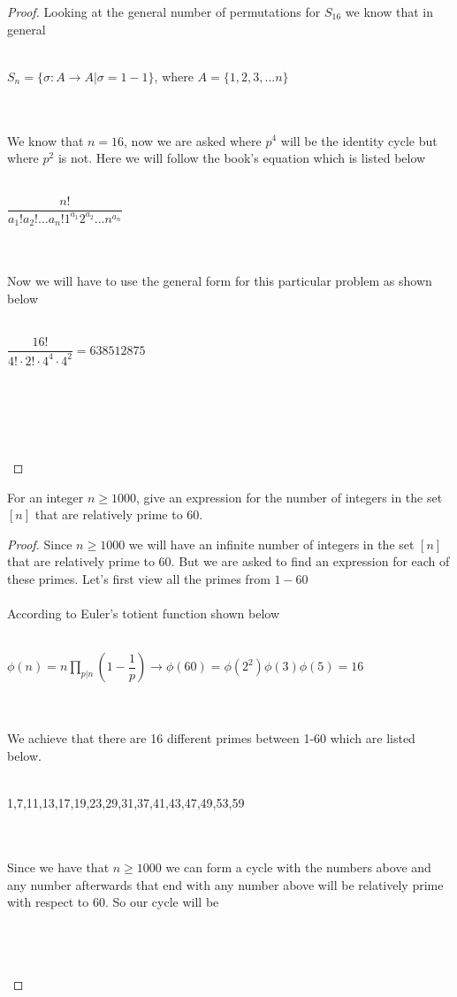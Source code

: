 \documentclass[12pt]{article}
\newenvironment{problem}[2][Problem]{\begin{trivlist}
\item[\hskip \labelsep {\bfseries #1}\hskip \labelsep {\bfseries #2.}]}{\end{trivlist}}
\begin{document}
\begin{proof}
Looking at the general number of permutations for $S_{16}$ we know that in general \\ \\
\centerline{$S_n = \{ \sigma : A \rightarrow A | \sigma = 1-1\}$, where $A = \{1,2,3,...n\}$} \\ \\
We know that $n=16$, now we are asked where $p^4$ will be the identity cycle but where $p^2$ is not.
Here we will follow the book's equation which is listed below \\ \\
\centerline{$\displaystyle{\dfrac{n!}{a_1!a_2!...a_n!1^{a_1}2^{a_2}...n^{a_n}}}$} \\ \\
Now we will have to use the general form for this particular problem as shown below \\ \\
\centerline{$\displaystyle{\dfrac{16!}{4!\cdot 2!\cdot4^4 \cdot 4^2}} =  638512875 $}\\ \\
\centerline{} \\ \\


\end{proof}

\begin{problem}{4}
For an integer $n \geq 1000$, give an expression for the number of integers in the set $[n]$ that are relatively prime to 60.
\end{problem}

\begin{proof}
Since $n \geq 1000$ we will have an infinite number of integers in the set $[n]$ that are relatively prime to 60. But we are asked to find an expression for each of these primes. Let's first view all the primes from $1-60$ \\ \\
According to Euler's totient function shown below \\ \\
\centerline{$\phi(n) = n \displaystyle\prod_{p|n}(1-\dfrac{1}{p}) \rightarrow \phi(60) = \phi(2^2)\phi(3)\phi(5) = 16$} \\ \\
We achieve that there are 16 different primes between 1-60 which are listed below. \\ \\
\centerline{1,7,11,13,17,19,23,29,31,37,41,43,47,49,53,59} \\ \\
Since we have that $n \geq 1000$ we can form a cycle with the numbers above and any number afterwards that end with any number above will be relatively prime with respect to 60. So our cycle will be \\ \\
\centerline{} \\ \\
\end{proof}
\end{document}
